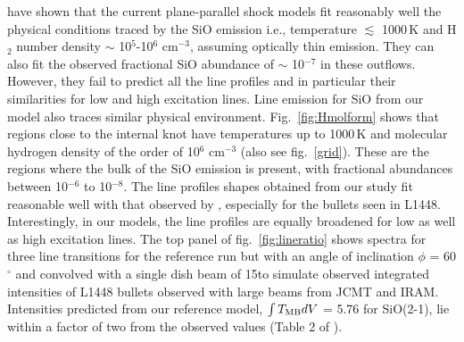 \documentclass[useAMS,usenatbib]{mn2e}
\begin{document}
\cite{Nisini:2007p13128} have shown that the current
plane-parallel shock models fit reasonably well the physical
conditions traced by the SiO emission i.e., temperature $\lesssim$
1000\,K and H$_{2}$ number density $\sim$ 10$^{5}$-10$^{6}$
cm$^{-3}$, assuming optically thin emission. 
They can also fit the observed fractional SiO abundance of
$\sim$ 10$^{-7}$ in these outflows. However, they fail to predict all
the line profiles and in particular their similarities for low and
high excitation lines. Line emission for SiO from our model also traces similar
physical environment. Fig.~\ref{fig:Hmolform} shows that regions close
to the internal knot have temperatures up to 1000\,K and molecular
hydrogen density of the order of 10$^{6}$ cm$^{-3}$ (also see
fig.~\ref{grid}). These are the regions where the bulk of the SiO
emission is present, with fractional abundances between 10$^{-6}$ to 10$^{-8}$.
The line profiles shapes obtained from our study fit reasonable well with that observed by
\cite{Nisini:2007p13128}, especially for the bullets seen in
L1448. Interestingly, in our models, the line profiles are equally broadened for low as well
as high excitation lines. The top panel of fig.~\ref{fig:lineratio} shows spectra for three line
transitions for the reference run but with an angle of inclination
$\phi$ = 60$^{\circ}$ and convolved with a single dish beam of
15\arcsec to simulate observed integrated
intensities of L1448 bullets observed with large beams from JCMT and
IRAM. Intensities predicted from our reference model, $\int T_{\rm MB} dV$ = 5.76 for SiO(2-1), 
lie within a factor of two from the observed values (Table 2 of \citealt{Nisini:2007p13128}).
%
\end{document}

